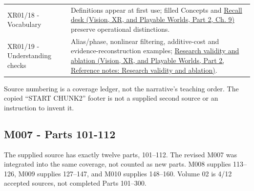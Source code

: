{\begin{longtable}[]{@{}
  >{\raggedright\arraybackslash}p{}
  >{\raggedright\arraybackslash}p{}@{}}
XR01/18 - Vocabulary & Definitions appear at first use; filled Concepts and \href{../07-Vision-XR-and-Playable-Worlds-P02/main.pdf\#nameddest=04-visual-computing-ii-ch042-teach-the-distinctions-from-a-blank-board}{Recall desk (Vision, XR, and Playable Worlds, Part 2, Ch. 9)} preserve operational distinctions. \\
XR01/19 - Understanding checks & Alias/phase, nonlinear filtering, additive-cost and evidence-reconstruction examples; \href{../07-Vision-XR-and-Playable-Worlds-P02/main.pdf\#nameddest=appendix-65788587ef78}{Research validity and ablation (Vision, XR, and Playable Worlds, Part 2, Reference notes: Research validity and ablation)}. \\
\end{longtable}
}

Source numbering is a coverage ledger, not the narrative's teaching order. The copied ``START CHUNK2'' footer is not a supplied second source or an instruction to invent it.

\subsection{M007 - Parts 101-112}\label{appendix-fd090d982a15-m007---parts-101-112}

\hypertarget{appendix-fd090d982a15-m007---parts-101-112}{}

The supplied source has exactly twelve parts, 101--112. The revised M007 was integrated into the same coverage, not counted as new parts. M008 supplies 113--126, M009 supplies 127--147, and M010 supplies 148--160. Volume 02 is 4/12 accepted sources, not completed Parts 101--300.


